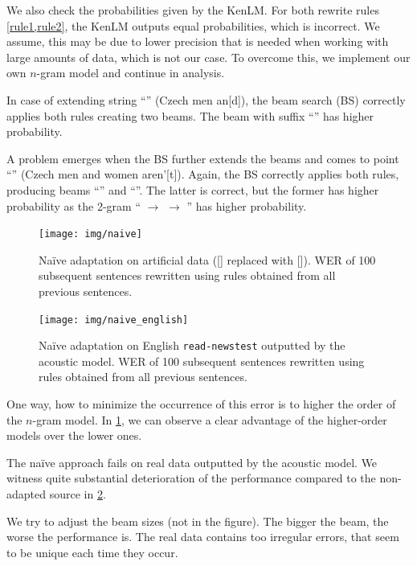 We also check the probabilities given by the KenLM. For both rewrite rules \cref{rule1,rule2}, the KenLM outputs equal probabilities, which is incorrect. We assume, this may be due to lower precision that is needed when working with large amounts of data, which is not our case. To overcome this, we implement our own $n$-gram model and continue in analysis.

In case of extending string ``'' (Czech men an[d]), the beam search (BS) correctly applies both rules creating two beams. The beam with suffix ``'' has higher probability.

A problem emerges when the BS further extends the beams and comes to point ``'' (Czech men and women aren'[t]). Again, the BS correctly applies both rules, producing beams ``'' and ``''. The latter is correct, but the former has higher probability as the 2-gram `` $\rightarrow$   $\rightarrow$ '' has higher probability.

\begin{figure}[h]
	\texttt{[image: img/naive]}
	\caption{Na\"ive adaptation on artificial data ([] replaced with []). WER of 100 subsequent sentences rewritten using rules obtained from all previous sentences.}
	\label{fig:naive} 
\end{figure}

\begin{figure}[h]
	\texttt{[image: img/naive\_english]}
	\caption{Na\"ive adaptation on English \texttt{read-newstest} outputted by the acoustic model. WER of 100 subsequent sentences rewritten using rules obtained from all previous sentences.}
	\label{fig:naive_en} 
\end{figure}

One way, how to minimize the occurrence of this error is to higher the order of the $n$-gram model. In \cref{fig:naive}, we can observe a clear advantage of the higher-order models over the lower ones.

The na\"ive approach fails on real data outputted by the acoustic model. We witness quite substantial deterioration of the performance compared to the non-adapted source in \cref{fig:naive_en}. 

We try to adjust the beam sizes (not in the figure). The bigger the beam, the worse the performance is. The real data contains too irregular errors, that seem to be unique each time they occur.

